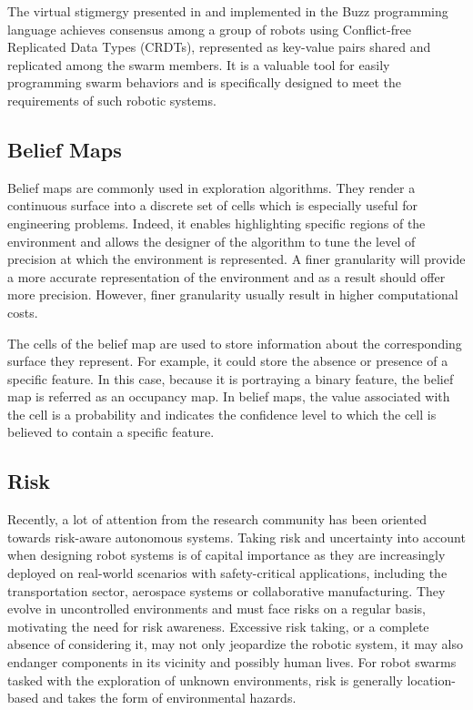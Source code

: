 The virtual stigmergy presented in \cite{pinciroliTuple2016} and implemented in the Buzz programming language \cite{pinciroliBuzz2016} achieves consensus among
a group of robots using Conflict-free Replicated Data Types (CRDTs), represented as key-value pairs shared and replicated among the swarm members.  It is a valuable tool for easily programming swarm behaviors and is specifically designed to meet the requirements of such robotic systems. 

\subsection{Belief Maps}
Belief maps are commonly used in exploration algorithms. They render a continuous surface into a discrete set of cells which is especially useful for engineering problems. Indeed, it enables highlighting specific regions of the environment and allows the designer of the algorithm to tune the level of precision at which the environment is represented. A finer granularity will provide a more accurate representation of the environment and as a result should offer more precision. However, finer granularity usually result in higher computational costs. 

The cells of the belief map are used to store information about the corresponding surface they represent. For example, it could store the absence or presence of a specific feature. In this case, because it is portraying a binary feature, the belief map is referred as an occupancy map. In belief maps, the value associated with the cell is a probability and indicates the confidence level to which the cell is believed to contain a specific feature.

\subsection{Risk}
Recently, a lot of attention from the research community has been oriented towards risk-aware autonomous systems. Taking risk and uncertainty into account when designing robot systems is of capital importance as they are increasingly deployed on real-world scenarios with safety-critical applications, including the transportation sector, aerospace systems or collaborative manufacturing. They evolve in uncontrolled environments and must face risks on a regular basis, motivating the need for risk awareness. Excessive risk taking, or a complete absence of considering it, may not only jeopardize the robotic system, it may also endanger components in its vicinity and possibly human lives. For robot swarms tasked with the exploration of unknown environments, risk is generally location-based and takes the form of environmental hazards. 


